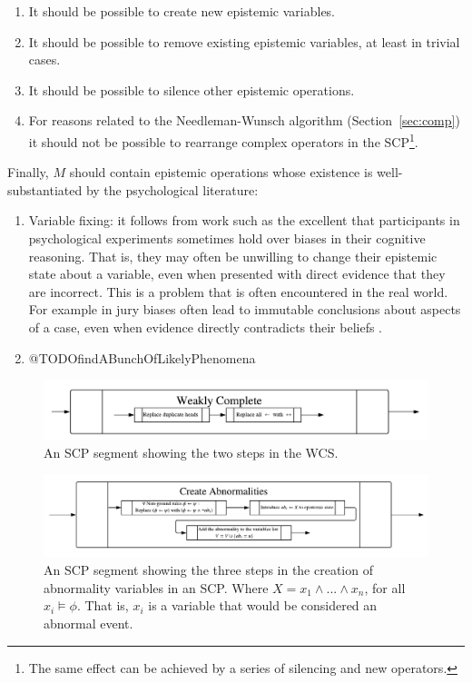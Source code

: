 \documentclass{article}
\begin{document}
\begin{enumerate}
\item It should be possible to create new epistemic variables.
\item It should be possible to remove existing epistemic variables, at least in trivial cases.
\item It should be possible to silence other epistemic operations.
\item For reasons related to the Needleman-Wunsch algorithm (Section~\ref{sec:comp}) it should not be possible to rearrange complex operators in the SCP\footnote{The same effect can be achieved by a series of silencing and new operators.}.
\end{enumerate}

Finally, $M$ should contain epistemic operations whose existence is well-substantiated by the psychological literature:

\begin{enumerate}
\item Variable fixing: it follows from work such as the excellent \cite{griffiths1994role} that participants in psychological experiments sometimes hold over biases in their cognitive reasoning. That is, they may often be unwilling to change their epistemic state about a variable, even when presented with direct evidence that they are incorrect. This is a problem that is often encountered in the real world. For example in jury biases often lead to immutable conclusions about aspects of a case, even when evidence directly contradicts their beliefs \citep{bray1978authoritarianism}	.
\item @TODOfindABunchOfLikelyPhenomena
\end{enumerate}

\begin{figure}
 \centering \includegraphics[scale=0.75]{weaklycompleteSCP}
\caption{An SCP segment showing the two steps in the WCS.}
\label {fig:broadWCS}
\end{figure}

\begin{figure}
 \centering \includegraphics[scale=0.75]{abnormalitySCP}
\caption{An SCP segment showing the three steps in the creation of abnormality variables in an SCP. Where $X = x_1 \land ... \land x_n$, for all $x_i \models \phi$. That is, $x_i$ is a variable that would be considered an abnormal event.}
\label {fig:abnormality}
\end{figure}
\end{document}
